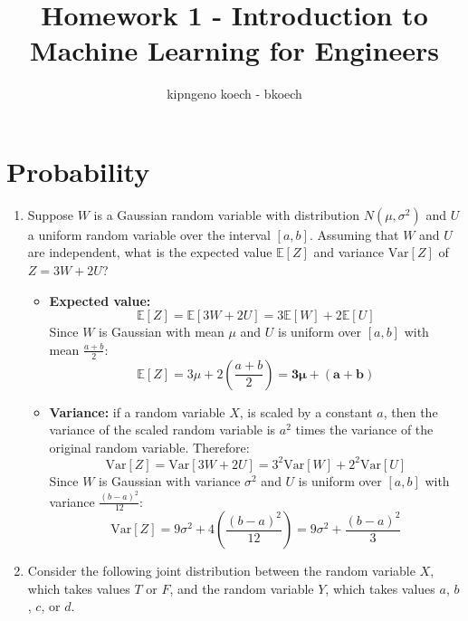 \documentclass[a3paper,12pt]{extarticle} %
\begin{document}
\author{kipngeno koech - bkoech}
\title{Homework 1 - Introduction to Machine Learning for Engineers}   
\maketitle

\medskip

\maketitle

\section{Probability}
\begin{enumerate}
    \item Suppose \( W \) is a Gaussian random variable with distribution \( N(\mu, \sigma^2) \) and \( U \) a uniform random variable over the interval \([a, b]\). Assuming that \( W \) and \( U \) are independent, what is the expected value \( \mathbb{E}[Z] \) and variance \( \text{Var}[Z] \) of \( Z = 3W + 2U \)?

\begin{itemize}
    \item \textbf{Expected value:}
    \[
    \mathbb{E}[Z] = \mathbb{E}[3W + 2U] = 3\mathbb{E}[W] + 2\mathbb{E}[U]
    \]
    Since \( W \) is Gaussian with mean \( \mu \) and \( U \) is uniform over \([a, b]\) with mean \( \frac{a+b}{2} \):
    \[
    \mathbb{E}[Z] = 3\mu + 2\left(\frac{a+b}{2}\right) =\mathbf{ 3\mu + (a + b)}
    \]

    \item \textbf{Variance:}
    if a random variable \(X\), is scaled by a constant \(a\), then the variance of the scaled random variable is \(a^2\) times the variance of the original random variable. Therefore:
    \[
    \text{Var}[Z] = \text{Var}[3W + 2U] = 3^2\text{Var}[W] + 2^2\text{Var}[U]
    \]
    Since \( W \) is Gaussian with variance \( \sigma^2 \) and \( U \) is uniform over \([a, b]\) with variance \( \frac{(b-a)^2}{12} \):
    \[
    \text{Var}[Z] = 9\sigma^2 + 4\left(\frac{(b-a)^2}{12}\right) = 9\sigma^2 + \frac{(b-a)^2}{3}
    \]
\end{itemize}
\item Consider the following joint distribution between the random variable \( X \), which takes values \( T \) or \( F \), and the random variable \( Y \), which takes values \( a \), \( b \), \( c \), or \( d \).


\end{enumerate}
\end{document}
